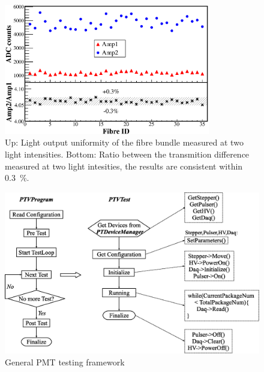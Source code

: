 \documentclass[review,number,sort&compress]{elsarticle}
\begin{document}


\begin{figure}
 \centering
 \includegraphics[width=90mm]{fibre_diff}
\caption{
Up: Light output uniformity of the fibre bundle measured at two light intensities.
Bottom: Ratio between the transmition difference measured at two light intesities, the results are consistent within \textpm\SI{0.3}{\percent}.}
\label{fig:fibre_diff}
\end{figure} 

\begin{figure}
  \centering
 \includegraphics[width=130mm]{software_framework}
\caption{General PMT testing framework}
\label{fig:software_framework}
\end{figure}
\end{document}
